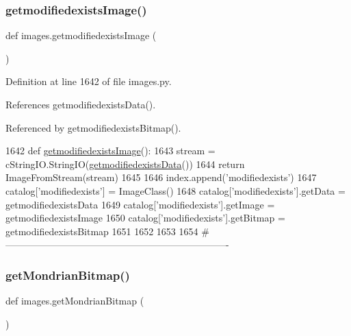 \mbox{\label{namespaceimages_ae65babb8d1bc2e6da9a094b09555867c}} 
\subsubsection{\texorpdfstring{getmodifiedexists\+Image()}{getmodifiedexistsImage()}}
{\footnotesize\ttfamily def images.\+getmodifiedexists\+Image (\begin{DoxyParamCaption}{ }\end{DoxyParamCaption})}



Definition at line 1642 of file images.\+py.



References getmodifiedexists\+Data().



Referenced by getmodifiedexists\+Bitmap().


\begin{DoxyCode}
1642 \textcolor{keyword}{def }\hyperlink{namespaceimages_ae65babb8d1bc2e6da9a094b09555867c}{getmodifiedexistsImage}():
1643     stream = cStringIO.StringIO(\hyperlink{namespaceimages_aea5b717eed65e55064d892d751ee42a9}{getmodifiedexistsData}())
1644     \textcolor{keywordflow}{return} ImageFromStream(stream)
1645 
1646 index.append(\textcolor{stringliteral}{'modifiedexists'})
1647 catalog[\textcolor{stringliteral}{'modifiedexists'}] = ImageClass()
1648 catalog[\textcolor{stringliteral}{'modifiedexists'}].getData = getmodifiedexistsData
1649 catalog[\textcolor{stringliteral}{'modifiedexists'}].getImage = getmodifiedexistsImage
1650 catalog[\textcolor{stringliteral}{'modifiedexists'}].getBitmap = getmodifiedexistsBitmap
1651 
1652 
1653 
1654 \textcolor{comment}{#----------------------------------------------------------------------}
\end{DoxyCode}
\mbox{\label{namespaceimages_a3ae00d30a729f478de891d5d97fb7608}} 
\subsubsection{\texorpdfstring{get\+Mondrian\+Bitmap()}{getMondrianBitmap()}}
{\footnotesize\ttfamily def images.\+get\+Mondrian\+Bitmap (\begin{DoxyParamCaption}{ }\end{DoxyParamCaption})}



